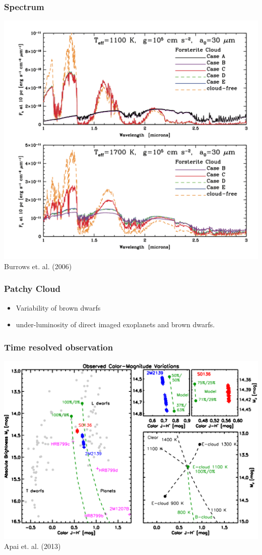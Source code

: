\message{ !name(May13.tex)}\documentclass[14pt]{beamer}
\newcommand*\figcite[1]{\vspace*{\fill}\raggedleft\footnotesize{#1}}
\begin{document}
\begin{frame}
  \frametitle{Spectrum}
  \centering
  \includegraphics[height=0.85\textheight]{spec}\\
  \figcite{Burrows et. al. (2006)}
\end{frame}

\begin{frame}
  \frametitle{Patchy Cloud}
  \begin{itemize}
  \item Variability of brown dwarfs
  \item under-luminosity of direct imaged exoplanets and brown dwarfs.
  \end{itemize}
\end{frame}

\begin{frame}
  \frametitle{Time resolved observation}
  \includegraphics[width=\textwidth]{CMD}\\
  \figcite{Apai et. al. (2013)}
\end{frame}
\end{document}
